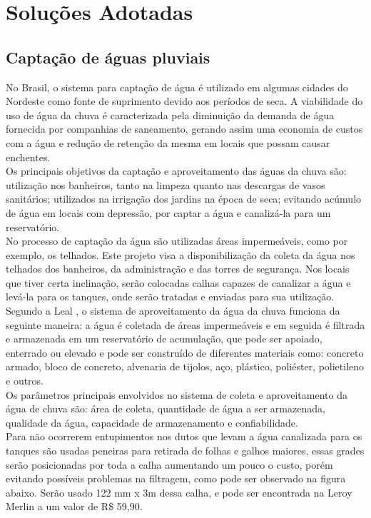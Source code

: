 \section{Solu\c{c}\~oes Adotadas}

\subsection{Capta\c{c}\~ao de \'aguas pluviais}

No Brasil, o sistema para capta\c{c}\~ao de \'agua \'e utilizado em algumas cidades do Nordeste como fonte de suprimento devido aos per\'iodos de seca. A viabilidade do uso de \'agua da chuva \'e caracterizada pela diminui\c{c}\~ao da demanda de \'agua fornecida por companhias de saneamento, gerando assim uma economia de custos com a \'agua e redu\c{c}\~ao de reten\c{c}\~ao da mesma em locais que possam causar enchentes. \cite{MAY} \\ Os principais objetivos da capta\c{c}\~ao e aproveitamento das \'aguas da chuva s\~ao: utiliza\c{c}\~ao nos banheiros, tanto na limpeza quanto nas descargas de vasos sanit\'arios; utilizados na irriga\c{c}\~ao dos jardins na \'epoca de seca; evitando ac\'umulo de \'agua em locais com depress\~ao, por captar a \'agua e canaliz\'a-la para um reservat\'orio. \\ No processo de capta\c{c}\~ao da \'agua s\~ao utilizadas \'areas imperme\'aveis, como por exemplo, os telhados. Este projeto visa a disponibiliza\c{c}\~ao da coleta da \'agua nos telhados dos banheiros, da administra\c{c}\~ao e das torres de seguran\c{c}a. Nos locais que tiver certa inclina\c{c}\~ao, ser\~ao colocadas calhas capazes de canalizar a \'agua e lev\'a-la para os tanques, onde ser\~ao tratadas e enviadas para sua utiliza\c{c}\~ao. \cite{MAY} \\ Segundo a Leal \cite{LEAL}, o sistema de aproveitamento da \'agua da chuva funciona da seguinte maneira: a \'agua \'e coletada de \'areas imperme\'aveis e em seguida \'e filtrada e armazenada em um reservat\'orio de acumula\c{c}\~ao, que pode ser apoiado, enterrado ou elevado e pode ser constru\'ido de diferentes materiais como: concreto armado, bloco de concreto, alvenaria de tijolos, a\c{c}o, pl\'astico, poli\'ester, polietileno e outros. \\ Os par\^ametros principais envolvidos no sistema de coleta e aproveitamento da \'agua de chuva s\~ao: \'area de coleta, quantidade de \'agua a ser armazenada, qualidade da \'agua, capacidade de armazenamento e confiabilidade. \\ Para n\~ao ocorrerem entupimentos nos dutos que levam a \'agua canalizada para os tanques s\~ao usadas peneiras para retirada de folhas e galhos maiores, essas grades ser\~ao posicionadas por toda a calha aumentando um pouco o custo, por\'em evitando poss\'iveis problemas na filtragem, como pode ser observado na figura abaixo. Ser\~ao usado 122 mm x 3m dessa calha, e pode ser encontrada na Leroy Merlin a um valor de R\$ 59,90. 

